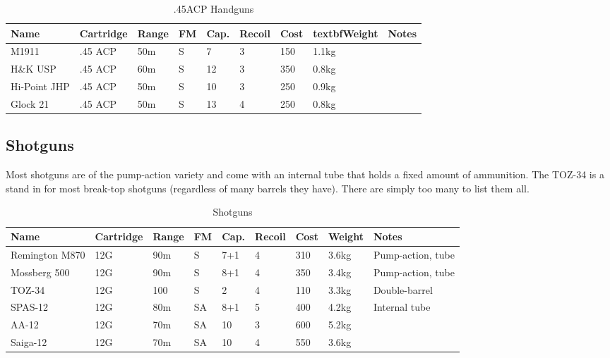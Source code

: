 \begin{table}
  \caption{.45ACP Handguns}
  \label{tab:Handguns45}
  \begin{center}
    \begin{tabular}{| l | l | l | l | l | l | l | l | l |}
      \hline
      \textbf{Name} & \textbf{Cartridge} & \textbf{Range} &
      \textbf{FM} & \textbf{Cap.} & \textbf{Recoil} &
      \textbf{Cost} & textbf{Weight} & \textbf{Notes} \\ \hline

      M1911        & .45 ACP & 50m & S &  7 & 3  & 150 & 1.1kg & \\ \hline
      H\&K USP     & .45 ACP & 60m & S & 12 & 3  & 350 & 0.8kg & \\ \hline
      Hi-Point JHP & .45 ACP & 50m & S & 10 & 3  & 250 & 0.9kg & \\ \hline
      Glock 21     & .45 ACP & 50m & S & 13 & 4  & 250 & 0.8kg & \\ \hline

    \end{tabular}
  \end{center}
\end{table}

\subsection{Shotguns}
\label{sub:9-Shotguns}

Most shotguns are of the pump-action variety and come with an internal tube that
holds a fixed amount of ammunition. The TOZ-34 is a stand in for most break-top
shotguns (regardless of many barrels they have). There are simply too many to
list them all.

\begin{table}
  \label{tab:Shotguns}
  \caption{Shotguns}
  \begin{center}
    \begin{tabular}{| l | l | l | l | l | l | l | l | l |}
      \hline
      \textbf{Name} & \textbf{Cartridge} & \textbf{Range} &
      \textbf{FM} & \textbf{Cap.} & \textbf{Recoil} &
      \textbf{Cost} & \textbf{Weight} & \textbf{Notes} \\ \hline

      Remington M870 & 12G & 90m & S  & 7+1 & 4 & 310 & 3.6kg & Pump-action, tube \\ \hline
      Mossberg 500   & 12G & 90m & S  & 8+1 & 4 & 350 & 3.4kg & Pump-action, tube \\ \hline
      TOZ-34         & 12G & 100 & S  & 2   & 4 & 110 & 3.3kg & Double-barrel \\ \hline
      SPAS-12        & 12G & 80m & SA & 8+1 & 5 & 400 & 4.2kg & Internal tube \\ \hline
      AA-12          & 12G & 70m & SA & 10  & 3 & 600 & 5.2kg & \\ \hline
      Saiga-12       & 12G & 70m & SA & 10  & 4 & 550 & 3.6kg & \\ \hline

    \end{tabular}
  \end{center}
\end{table}

